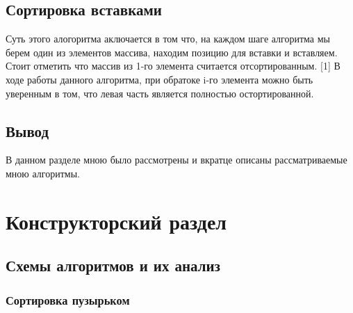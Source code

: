 \documentclass[12pt]{report}
\begin{document}
\section{Сортировка вставками}

	Суть этого алогоритма аключается в том что, на каждом шаге алгоритма мы берем один из элементов массива, находим позицию для вставки и вставляем. Стоит отметить что массив из 1-го элемента считается отсортированным. [1] В ходе работы данного алгоритма, при обратоке i-го элемента можно быть уверенным в том, что левая часть является полностью остортированной.
	
\section*{Вывод}

	В данном разделе мною было рассмотрены и вкратце описаны рассматриваемые мною алгоритмы.


\chapter{Конструкторский раздел}
\section{Схемы алгоритмов и их анализ}

\subsection{Сортировка пузырьком}
\end{document}

